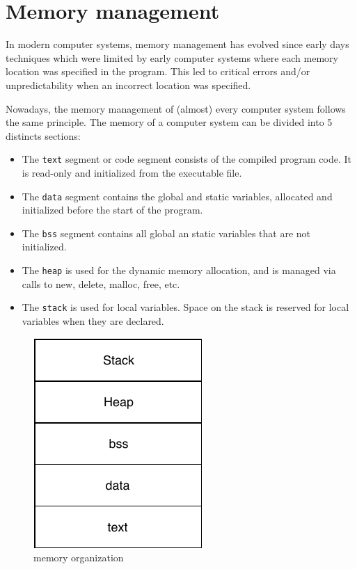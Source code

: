 \section{Memory management}


In modern computer systems, memory management has evolved since early days techniques which were limited
    by early computer systems where each memory location was specified in the program.
This led to critical errors and/or unpredictability when an incorrect location was specified.

Nowadays, the memory management of (almost) every computer system follows the same principle.
The memory of a computer system can be divided into 5 distincts sections\cite{systinfo}:
\begin{itemize}
    \item The \texttt{text} segment or code segment consists of the compiled program code. It is read-only and initialized from the executable file.
    \item The \texttt{data} segment contains the global and static variables, allocated and initialized before the start of the program.
    \item The \texttt{bss} segment contains all global an static variables that are not initialized.
    \item The \texttt{heap} is used for the dynamic memory allocation, and is managed via calls to new, delete, malloc, free, etc.
    \item The \texttt{stack} is used for local variables. Space on the stack is reserved for local variables when they are declared.
\end{itemize}

\begin{figure}[!h]
    \centering
    \includegraphics[]{assets/memory.pdf}
    \caption{\label{fig:kernel-types}memory organization}
\end{figure}

